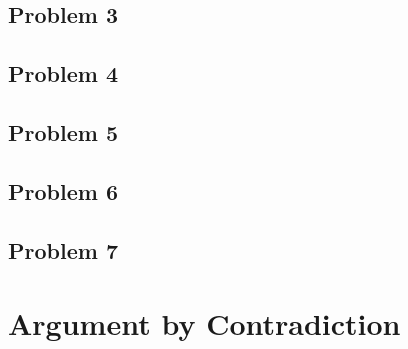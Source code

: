 \documentclass{article}
\begin{document}
\subsection{Problem 3}

\hfill

\subsection{Problem 4}

\hfill

\subsection{Problem 5}

\hfill

\subsection{Problem 6}

\hfill

\subsection{Problem 7}

\hfill

\break

\section{Argument by Contradiction}
\end{document}
